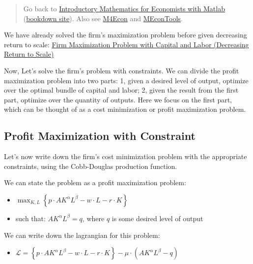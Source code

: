 \documentclass[
]{book}
\providecommand{\tightlist}{%
  \setlength{\itemsep}{0pt}\setlength{\parskip}{0pt}}
\begin{document}
\begin{quote}
Go back to \href{https://math4econ.github.io/}{Introductory Mathematics for Economists with Matlab} (\href{https://math4econ.github.io/bookdown}{bookdown site}). Also see \href{http://fanwangecon.github.io/M4Econ}{M4Econ} and \href{https://fanwangecon.github.io/MEconTools/}{MEconTools}.
\end{quote}

We have already solved the firm's maximization problem before given
decreasing return to scale: \href{https://math4econ.github.io/matrix_application/KL_borrowhire_firm.html}{Firm Maximization Problem with Capital and
Labor (Decreasing Return to
Scale)}

Now, Let's solve the firm's problem with constraints. We can divide the
profit maximization problem into two parts: 1, given a desired level of
output, optimize over the optimal bundle of capital and labor; 2, given
the result from the first part, optimize over the quantity of outputs.
Here we focus on the first part, which can be thought of as a cost
minimization or profit maximization problem.

\hypertarget{profit-maximization-with-constraint}{%
\subsection{Profit Maximization with Constraint}\label{profit-maximization-with-constraint}}

Let's now write down the firm's cost minimization problem with the
appropriate constraints, using the Cobb-Douglas production function.

We can state the problem as a profit maximization problem:

\begin{itemize}
\item
  \(\displaystyle \max_{K,L} \left\lbrace p\cdot AK^{\alpha } L^{\beta } -w\cdot L-r\cdot K\right\rbrace\)
\item
  such that: \(AK^{\alpha } L^{\beta } =q\), where \(q\) is some desired
  level of output
\end{itemize}

We can write down the lagrangian for this problem:

\begin{itemize}
\tightlist
\item
  \(\displaystyle \mathcal{L}=\left\lbrace p\cdot AK^{\alpha } L^{\beta } -w\cdot L-r\cdot K\right\rbrace -\mu \cdot (AK^{\alpha } L^{\beta } -q)\)
\end{itemize}
\end{document}
